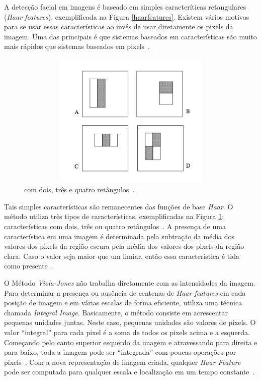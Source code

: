 A detecção facial em imagens é baseado em simples caracteríticas retangulares (\textit{Haar features}), exemplificada na Figura \ref{haarfeatures}. Existem vários motivos para se usar essas características ao invés de usar diretamente os pixels da imagem. Uma das principais é que sistemas baseados em características são muito mais rápidos que sistemas baseados em pixels~\cite{violajones}. 

\begin{figure}[hbt]
		\begin{center}
			\includegraphics[height=6.5cm,width=12.5cm]{figuras/2.FundamentacaoTeorica/haarfeaturestypes.png}
		\end{center}
		\caption{ com dois, três e quatro retângulos~\cite{violajones}.}
		\label{haarfeaturestypes}
	\end{figure}

Tais simples características são remanecentes das funções de base \textit{Haar}. O método utiliza três tipos de características, exemplificadas na Figura \ref{haarfeaturestypes}: características com dois, três ou quatro retângulos~\cite{violajones}. A presença de uma característica em uma imagem é determinada pela subtração da média dos valores dos pixels da região escura pela média dos valores dos pixels da região clara. Caso o valor seja maior que um limiar, então essa característica é tida como presente~\cite{servodetection}.

O Método \textit{Viola-Jones} não trabalha diretamente com as intensidades da imagem. Para determinar a presença ou ausência de centenas de \textit{Haar features} em cada posição de imagem e em várias escalas de forma eficiente, utiliza uma técnica chamada \textit{Integral Image}. Basicamente, o método consiste em acrescentar pequenas unidades juntas. Neste caso, pequenas unidades são valores de pixels. O valor ``integral'' para cada pixel é a soma de todos os pixels acima e a esquerda. Começando pelo canto superior esquerdo da imagem e atravessando para direita e para baixo, toda a imagem pode ser ``integrada'' com poucas operações por pixels~\cite{servodetection, violajones}. Com a nova representação de imagem criada, qualquer \textit{Haar Feature} pode ser computada para qualquer escala e localização em um tempo constante~\cite{violajones}.

